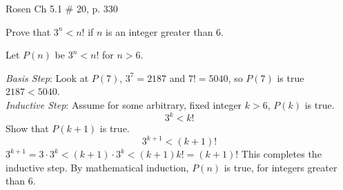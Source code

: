 \documentclass[12pt,addpoints]{exam}
\begin{document}
\begin{questions}
\question Rosen Ch 5.1 \# 20, p. 330
    \ifprintanswers
        \vspace{-10pt}
   \fi
\begin{solution}
Prove that $3^n < n!$ if $n$ is an integer greater than 6.

\smallskip
    Let $P(n)$ be $3^n < n!$ for $n > 6$.

    \textit{Basis Step}: Look at $P(7)$, $3^7 = 2187$ and $7! = 5040$, so $P(7)$ is true $2187 < 5040$. \\

    \textit{Inductive Step}:  Assume for some arbitrary, fixed integer $k > 6$, $P(k)$ is true.
    \[ 3^k < k! \]
    Show that $P(k+1)$ is true.
    \[ 3^{k+1} < (k+1)! \]
    $3^{k+1} = 3 \cdot 3^{k} < (k+1) \cdot 3^k < (k+1)k! = (k+1)!$
    This completes the inductive step.  By mathematical induction, $P(n)$ is true, for integers greater than 6.
\end{solution}



\end{questions}
\end{document}
